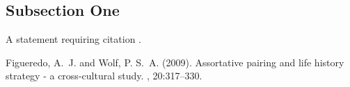 \documentclass[twoside,twocolumn]{article}
\begin{document}
\subsection{Subsection One}

A statement requiring citation \cite{Figueredo:2009dg}.


\begin{thebibliography}{99} %

Figueredo, A.~J. and Wolf, P. S.~A. (2009).
\newblock Assortative pairing and life history strategy - a cross-cultural
  study.
, 20:317--330.
 
\end{thebibliography}

\end{document}
